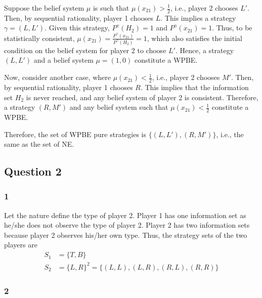 \documentclass[]{article}
\begin{document}
Suppose the belief system $\mu$ is such that $\mu(x_{21}) > \frac{1}{2}$, i.e., player 2 chooses $L'$. Then, by sequential rationality, player 1 chooses $L$. This implies a strategy $\gamma = (L, L')$. Given this strategy, $P^\gamma(H_2) = 1$ and $P^\gamma(x_{21}) = 1$. Thus, to be statistically consistent, $\mu(x_{21}) = \frac{P^\gamma(x_{21})}{P^\gamma(H_2)} = 1$, which also satisfies the initial condition on the belief system for player 2 to choose $L'$. Hence, a strategy $(L, L')$ and a belief system $\mu = (1, 0)$ constitute a WPBE.

Now, consider another case, where $\mu(x_{21}) < \frac{1}{2}$, i.e., player 2 chooses $M'$. Then, by sequential rationality, player 1 chooses $R$. This implies that the information set $H_2$ is never reached, and any belief system of player 2 is consistent. Therefore, a strategy $(R, M')$ and any belief system such that $\mu(x_{21}) < \frac{1}{2}$ constitute a WPBE.

Therefore, the set of WPBE pure strategies is $\{(L, L'), (R, M')\}$, i.e., the same as the set of NE.

\subsection*{Question 2}

\subsubsection*{1}

Let the nature define the type of player 2. Player 1 has one information set as he/she does not observe the type of player 2. Player 2 has two information sets because player 2 observes his/her own type. Thus, the strategy sets of the two players are
\begin{equation}
	\begin{split}
		S_1& = \{T, B\} \\ \nonumber
		S_2& = \{L, R\}^2 = \{(L, L), (L, R), (R, L), (R, R)\}
	\end{split}
\end{equation}
 
 \subsubsection*{2}
 
\end{document}
